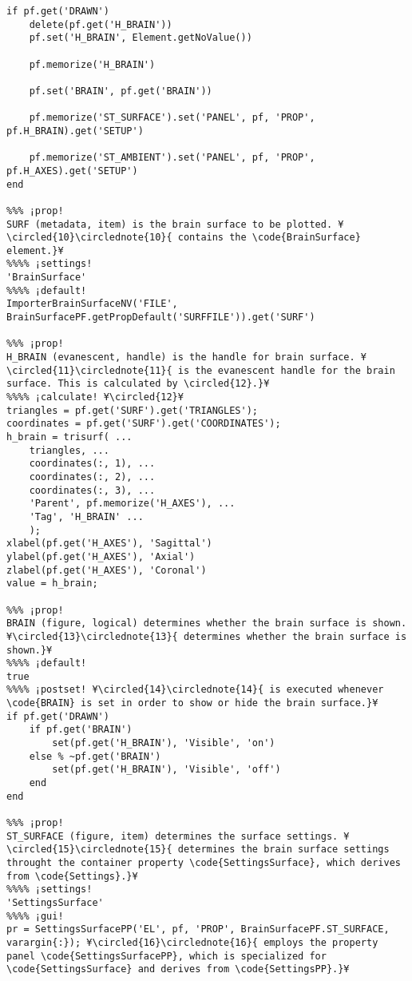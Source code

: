 \documentclass{tufte-handout}
\begin{document}
\begin{lstlisting}
if pf.get('DRAWN')
    delete(pf.get('H_BRAIN'))
    pf.set('H_BRAIN', Element.getNoValue())

    pf.memorize('H_BRAIN')

    pf.set('BRAIN', pf.get('BRAIN'))

    pf.memorize('ST_SURFACE').set('PANEL', pf, 'PROP', pf.H_BRAIN).get('SETUP')

    pf.memorize('ST_AMBIENT').set('PANEL', pf, 'PROP', pf.H_AXES).get('SETUP')
end

%%% ¡prop!
SURF (metadata, item) is the brain surface to be plotted. ¥\circled{10}\circlednote{10}{ contains the \code{BrainSurface} element.}¥
%%%% ¡settings!
'BrainSurface'
%%%% ¡default!
ImporterBrainSurfaceNV('FILE', BrainSurfacePF.getPropDefault('SURFFILE')).get('SURF')

%%% ¡prop!
H_BRAIN (evanescent, handle) is the handle for brain surface. ¥\circled{11}\circlednote{11}{ is the evanescent handle for the brain surface. This is calculated by \circled{12}.}¥
%%%% ¡calculate! ¥\circled{12}¥
triangles = pf.get('SURF').get('TRIANGLES');
coordinates = pf.get('SURF').get('COORDINATES');
h_brain = trisurf( ...
    triangles, ...
    coordinates(:, 1), ...
    coordinates(:, 2), ...
    coordinates(:, 3), ...
    'Parent', pf.memorize('H_AXES'), ...
    'Tag', 'H_BRAIN' ...
    );
xlabel(pf.get('H_AXES'), 'Sagittal')
ylabel(pf.get('H_AXES'), 'Axial')
zlabel(pf.get('H_AXES'), 'Coronal')
value = h_brain;

%%% ¡prop!
BRAIN (figure, logical) determines whether the brain surface is shown. ¥\circled{13}\circlednote{13}{ determines whether the brain surface is shown.}¥
%%%% ¡default!
true
%%%% ¡postset! ¥\circled{14}\circlednote{14}{ is executed whenever \code{BRAIN} is set in order to show or hide the brain surface.}¥
if pf.get('DRAWN')
    if pf.get('BRAIN')
        set(pf.get('H_BRAIN'), 'Visible', 'on')
    else % ~pf.get('BRAIN') 
        set(pf.get('H_BRAIN'), 'Visible', 'off')
    end
end

%%% ¡prop!
ST_SURFACE (figure, item) determines the surface settings. ¥\circled{15}\circlednote{15}{ determines the brain surface settings throught the container property \code{SettingsSurface}, which derives from \code{Settings}.}¥
%%%% ¡settings!
'SettingsSurface'
%%%% ¡gui!
pr = SettingsSurfacePP('EL', pf, 'PROP', BrainSurfacePF.ST_SURFACE, varargin{:}); ¥\circled{16}\circlednote{16}{ employs the property panel \code{SettingsSurfacePP}, which is specialized for \code{SettingsSurface} and derives from \code{SettingsPP}.}¥


\end{lstlisting}
\end{document}
